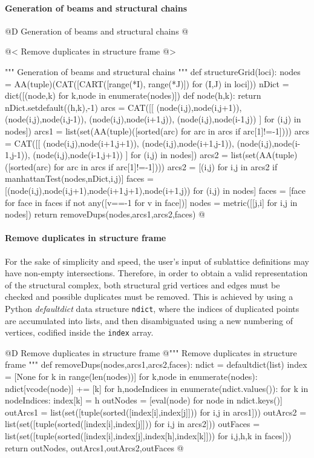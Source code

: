 \documentclass[11pt,oneside]{article}    %
\begin{document}
\paragraph{Generation of beams and structural chains}
@D Generation of beams and structural chains @{
@< Remove duplicates in structure frame @>

""" Generation of beams and structural chains """
def structureGrid(loci):
    nodes = AA(tuple)(CAT([CART([range(*I), range(*J)]) for (I,J) in loci]))
    nDict = dict([(node,k) for k,node in enumerate(nodes)])
    def node(h,k): return nDict.setdefault((h,k),-1)
    arcs = CAT([[ (node(i,j),node(i,j+1)), (node(i,j),node(i,j-1)),
        (node(i,j),node(i+1,j)), (node(i,j),node(i-1,j)) ] for (i,j) in nodes])
    arcs1 = list(set(AA(tuple)([sorted(arc) for arc in arcs if arc[1]!=-1])))
    arcs = CAT([[ (node(i,j),node(i+1,j+1)), (node(i,j),node(i+1,j-1)),
        (node(i,j),node(i-1,j-1)), (node(i,j),node(i-1,j+1)) ] for (i,j) in nodes])
    arcs2 = list(set(AA(tuple)([sorted(arc) for arc in arcs if arc[1]!=-1])))
    arcs2 = [(i,j) for i,j in arcs2 if manhattanTest(nodes,nDict,i,j)]
    faces = [(node(i,j),node(i,j+1),node(i+1,j+1),node(i+1,j)) for (i,j) in nodes]
    faces = [face for face in faces if not any([v==-1 for v in face])]
    nodes = metric([[j,i] for i,j in nodes])
    return removeDups(nodes,arcs1,arcs2,faces)
@}


\paragraph{Remove duplicates in structure frame}

For the sake of simplicity and speed, the user's input of sublattice definitions may have non-empty intersections. Therefore, in order to obtain a valid representation of the structural complex, both structural grid vertices and edges must be checked and possible duplicates must be removed. This is achieved by using a Python \emph{defaultdict} data structure \texttt{ndict}, where the indices of duplicated points are accumulated into lists, and then disambiguated using a new numbering of  vertices, codified inside the \texttt{index} array.

@D Remove duplicates in structure frame 
@{""" Remove duplicates in structure frame """
def removeDups(nodes,arcs1,arcs2,faces):
    ndict = defaultdict(list)
    index = [None for k in range(len(nodes))]
    for k,node in enumerate(nodes):
        ndict[vcode(node)] += [k]
    for h,nodeIndices in enumerate(ndict.values()):
        for k in nodeIndices:
            index[k] = h
    outNodes = [eval(node) for node in ndict.keys()]
    outArcs1 = list(set([tuple(sorted([index[i],index[j]])) for i,j in arcs1]))
    outArcs2 = list(set([tuple(sorted([index[i],index[j]])) for i,j in arcs2]))
    outFaces = list(set([tuple(sorted([index[i],index[j],index[h],index[k]])) 
        for i,j,h,k in faces]))
    return outNodes, outArcs1,outArcs2,outFaces
@}
\end{document}
